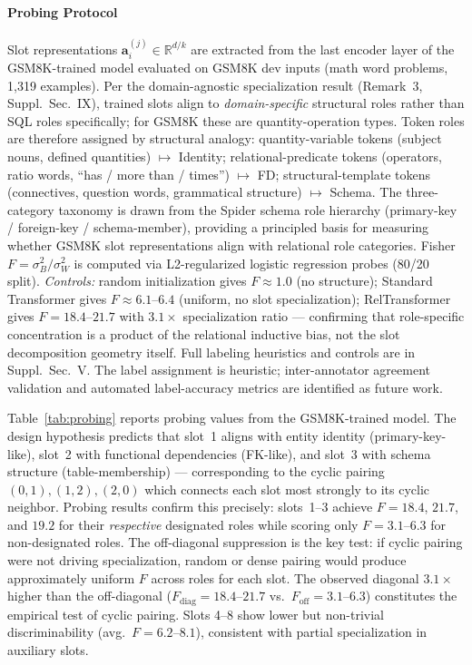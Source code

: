 \documentclass[conference]{IEEEtran}
\newcommand{\R}{\mathbb{R}}
\begin{document}
\paragraph{Probing Protocol}
Slot representations $\mathbf{a}_i^{(j)}\!\in\!\R^{d/k}$ are extracted from the last encoder layer of the GSM8K-trained model evaluated on GSM8K dev inputs (math word problems, 1,319 examples). Per the domain-agnostic specialization result (Remark~3, Suppl.\ Sec.~IX), trained slots align to \emph{domain-specific} structural roles rather than SQL roles specifically; for GSM8K these are quantity-operation types. Token roles are therefore assigned by structural analogy: quantity-variable tokens (subject nouns, defined quantities) $\mapsto$ Identity; relational-predicate tokens (operators, ratio words, ``has / more than / times'') $\mapsto$ FD; structural-template tokens (connectives, question words, grammatical structure) $\mapsto$ Schema. The three-category taxonomy is drawn from the Spider schema role hierarchy (primary-key / foreign-key / schema-member), providing a principled basis for measuring whether GSM8K slot representations align with relational role categories. Fisher $F{=}\sigma_B^2/\sigma_W^2$ is computed via L2-regularized logistic regression probes (80/20 split). \emph{Controls:} random initialization gives $F{\approx}1.0$ (no structure); Standard Transformer gives $F{\approx}6.1$--$6.4$ (uniform, no slot specialization); RelTransformer gives $F{=}18.4$--$21.7$ with $3.1{\times}$ specialization ratio --- confirming that role-specific concentration is a product of the relational inductive bias, not the slot decomposition geometry itself. Full labeling heuristics and controls are in Suppl.\ Sec.~V. The label assignment is heuristic; inter-annotator agreement validation and automated label-accuracy metrics are identified as future work.

Table~\ref{tab:probing} reports probing values from the GSM8K-trained model. The design hypothesis predicts that slot~1 aligns with entity identity (primary-key-like), slot~2 with functional dependencies (FK-like), and slot~3 with schema structure (table-membership) --- corresponding to the cyclic pairing $(0,1),(1,2),(2,0)$ which connects each slot most strongly to its cyclic neighbor. Probing results confirm this precisely: slots~1--3 achieve $F{=}18.4$, $21.7$, and $19.2$ for their \emph{respective} designated roles while scoring only $F{=}3.1$--$6.3$ for non-designated roles. The off-diagonal suppression is the key test: if cyclic pairing were not driving specialization, random or dense pairing would produce approximately uniform $F$ across roles for each slot. The observed diagonal $3.1\times$ higher than the off-diagonal ($F_{\mathrm{diag}}{=}18.4$--$21.7$ vs.\ $F_{\mathrm{off}}{=}3.1$--$6.3$) constitutes the empirical test of cyclic pairing. Slots 4--8 show lower but non-trivial discriminability (avg.\ $F{=}6.2$--$8.1$), consistent with partial specialization in auxiliary slots.
\end{document}
